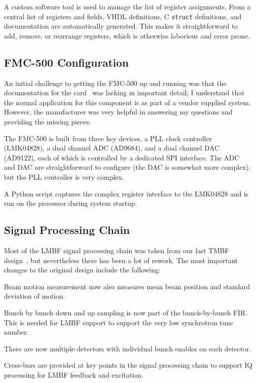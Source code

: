 \documentclass[
    a4paper,
    keeplastbox,            %
    hyphens,                %
    nospread,               %
]{jacow-2_1}
\begin{document}
A custom software tool is used to manage the list of register assignments.  From
a central list of registers and fields, VHDL definitions, C \texttt{struct}
definitions, and documentation are automatically generated.  This makes it
straightforward to add, remove, or rearrange registers, which is otherwise
laborious and error prone.


\subsection{FMC-500 Configuration}

An initial challenge to getting the FMC-500 up and running was that the
documentation for the card~\cite{fmc500} was lacking in important detail; I
understand that the normal application for this component is as part of a vendor
supplied system.  However, the manufacturer was very helpful in answering my
questions and providing the missing pieces.

The FMC-500 is built from three key devices, a PLL clock controller (LMK04828),
a dual channel ADC (AD9684), and a dual channel DAC (AD9122), each of which is
controlled by a dedicated SPI interface.  The ADC and DAC are straightforward to
configure (the DAC is somewhat more complex), but the PLL controller is very
complex.

A Python script captures the complex register interface to the LMK04828 and is
run on the processor during system startup.


\subsection{Signal Processing Chain}

Most of the LMBF signal processing chain was taken from our last TMBF
design~\cite{icalepcs2015}, but nevertheless there has been a lot of rework.
The most important changes to the original design include the following:

\begin{Itemize}
\item
    Beam motion measurement now also measures mean beam position and standard
    deviation of motion.
\item
    Bunch by bunch down and up sampling is now part of the bunch-by-bunch FIR.
    This is needed for LMBF support to support the very low synchrotron tune
    number.
\item
    There are now multiple detectors with individual bunch enables on each
    detector.
\item
    Cross-bars are provided at key points in the signal processing chain to
    support IQ processing for LMBF feedback and excitation.
\end{Itemize}
\end{document}
